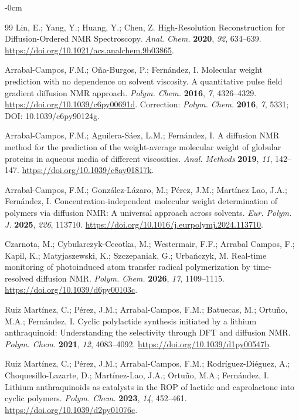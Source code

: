 \documentclass[mathematics,article,accept,moreauthors]{Definitions/mdpi}
\begin{document}
\begin{adjustwidth}{-\extralength}{0cm}
\begin{thebibliography}{99}
Lin, E.; Yang, Y.; Huang, Y.; Chen, Z. High-Resolution Reconstruction for Diffusion-Ordered NMR Spectroscopy. \emph{Anal. Chem.} \textbf{2020}, \emph{92}, 634--639. \url{https://doi.org/10.1021/acs.analchem.9b03865}.

Arrabal-Campos, F.M.; 
 Oña-Burgos, P.; Fernández, I. Molecular weight prediction with no dependence on solvent viscosity. A quantitative pulse field gradient diffusion NMR approach. \emph{Polym. Chem.} \textbf{2016}, \emph{7}, 4326--4329. \url{https://doi.org/10.1039/c6py00691d}. Correction: \emph{Polym. Chem.} \textbf{2016}, \emph{7}, 5331; DOI: 10.1039/c6py90124g.


Arrabal-Campos, F.M.; Aguilera-Sáez, L.M.; Fernández, I. A diffusion NMR method for the prediction of the weight-average molecular weight of globular proteins in aqueous media of different viscosities. \emph{Anal. Methods} \textbf{2019}, \emph{11}, 142--147. \url{https://doi.org/10.1039/c8ay01817k}.

Arrabal-Campos, F.M.; González-Lázaro, M.; Pérez, J.M.; Martínez Lao, J.A.; Fernández, I. Concentration-independent molecular weight determination of polymers via diffusion NMR: A universal approach across solvents. \emph{Eur. Polym. J.} \textbf{2025}, \emph{226}, 113710. \url{https://doi.org/10.1016/j.eurpolymj.2024.113710}.

Czarnota, M.; Cybularczyk-Cecotka, M.; Westermair, F.F.; Arrabal Campos, F.; Kapil, K.; Matyjaszewski, K.; Szczepaniak, G.; Urbańczyk, M. Real-time monitoring of photoinduced atom transfer radical polymerization by time-resolved diffusion NMR. \emph{Polym. Chem.} \textbf{2026}, \emph{17}, 1109--1115. \url{https://doi.org/10.1039/d6py00103c}.

Ruiz Martínez, C.; Pérez, J.M.; Arrabal-Campos, F.M.; Batuecas, M.; Ortuño, M.A.; Fernández, I. Cyclic polylactide synthesis initiated by a lithium anthraquinoid: Understanding the selectivity through DFT and diffusion NMR. \emph{Polym. Chem.} \textbf{2021}, \emph{12}, 4083--4092. \url{https://doi.org/10.1039/d1py00547b}.

Ruiz Martínez, C.; Pérez, J.M.; Arrabal-Campos, F.M.; Rodríguez-Diéguez, A.; Choquesillo-Lazarte, D.; Martínez-Lao, J.A.; Ortuño, M.A.; Fernández, I. Lithium anthraquinoids as catalysts in the ROP of lactide and caprolactone into cyclic polymers. \emph{Polym. Chem.} \textbf{2023}, \emph{14}, 452--461. \url{https://doi.org/10.1039/d2py01076c}.


\end{thebibliography}
\end{adjustwidth}
\end{document}
